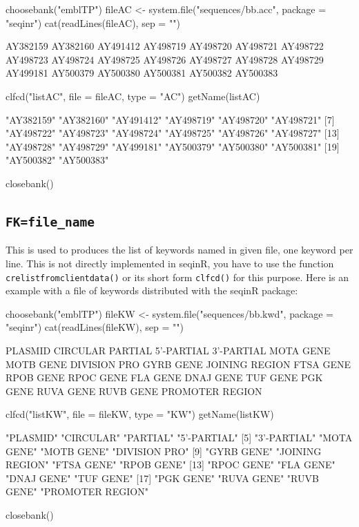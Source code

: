 \documentclass{article}
\begin{document}
\begin{Schunk}
\begin{Sinput}
 choosebank("emblTP")
 fileAC <- system.file("sequences/bb.acc", package = "seqinr")
 cat(readLines(fileAC), sep = "\n")
\end{Sinput}
\begin{Soutput}
AY382159
AY382160
AY491412
AY498719
AY498720
AY498721
AY498722
AY498723
AY498724
AY498725
AY498726
AY498727
AY498728
AY498729
AY499181
AY500379
AY500380
AY500381
AY500382
AY500383
\end{Soutput}
\begin{Sinput}
 clfcd("listAC", file = fileAC, type = "AC")
 getName(listAC)
\end{Sinput}
\begin{Soutput}
 [1] "AY382159" "AY382160" "AY491412" "AY498719" "AY498720" "AY498721"
 [7] "AY498722" "AY498723" "AY498724" "AY498725" "AY498726" "AY498727"
[13] "AY498728" "AY498729" "AY499181" "AY500379" "AY500380" "AY500381"
[19] "AY500382" "AY500383"
\end{Soutput}
\begin{Sinput}
 closebank()
\end{Sinput}
\end{Schunk}


\subsection{\texttt{FK=file\_name}}

This is used to produces the list of keywords named in given file, one keyword per line.
This is not directly implemented in seqinR, you have to use the function
\texttt{crelistfromclientdata()} or its short form \texttt{clfcd()} for this purpose. Here is an example with
a file of keywords distributed with the seqinR package:

\begin{Schunk}
\begin{Sinput}
 choosebank("emblTP")
 fileKW <- system.file("sequences/bb.kwd", package = "seqinr")
 cat(readLines(fileKW), sep = "\n")
\end{Sinput}
\begin{Soutput}
PLASMID
CIRCULAR
PARTIAL
5'-PARTIAL
3'-PARTIAL
MOTA GENE
MOTB GENE
DIVISION PRO
GYRB GENE
JOINING REGION
FTSA GENE
RPOB GENE
RPOC GENE
FLA GENE
DNAJ GENE
TUF GENE
PGK GENE
RUVA GENE
RUVB GENE
PROMOTER REGION
\end{Soutput}
\begin{Sinput}
 clfcd("listKW", file = fileKW, type = "KW")
 getName(listKW)
\end{Sinput}
\begin{Soutput}
 [1] "PLASMID"         "CIRCULAR"        "PARTIAL"         "5'-PARTIAL"     
 [5] "3'-PARTIAL"      "MOTA GENE"       "MOTB GENE"       "DIVISION PRO"   
 [9] "GYRB GENE"       "JOINING REGION"  "FTSA GENE"       "RPOB GENE"      
[13] "RPOC GENE"       "FLA GENE"        "DNAJ GENE"       "TUF GENE"       
[17] "PGK GENE"        "RUVA GENE"       "RUVB GENE"       "PROMOTER REGION"
\end{Soutput}
\begin{Sinput}
 closebank()
\end{Sinput}
\end{Schunk}
\end{document}
